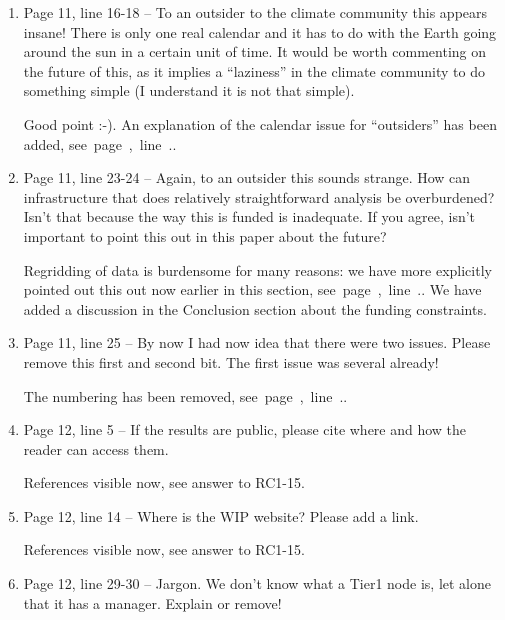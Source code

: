 \documentclass[gmd,manuscript]{copernicus}
\newcommand{\plref}[1]{\mbox{see page \pageref{p-#1}, line
    \lineref{l-#1}.}}
\newenvironment{answer}{\color{blue}}{}
\begin{document}
\begin{enumerate}[label=RC3-\arabic*,leftmargin=*]
  \begin{answer}
    References visible now, see answer to RC1-15.
  \end{answer}
\item Page 11, line 16-18 -- To an outsider to the climate community
  this appears insane! There is only one real calendar and it has to
  do with the Earth going around the sun in a certain unit of time. It
  would be worth commenting on the future of this, as it implies a
  “laziness” in the climate community to do something simple (I
  understand it is not that simple).

  \begin{answer}
    Good point :-). An explanation of the calendar issue for
    ``outsiders'' has been added, \plref{RC3-13}.
  \end{answer}
\item Page 11, line 23-24 -- Again, to an outsider this sounds strange.
  How can infrastructure that does relatively straightforward analysis
  be overburdened? Isn’t that because the way this is funded is
  inadequate. If you agree, isn’t important to point this out in this
  paper about the future?

  \begin{answer}
    Regridding of data is burdensome for many reasons: we have more
    explicitly pointed out this out now earlier in this section,
    \plref{RC3-14}. We have added a discussion in the Conclusion
    section about the funding constraints.
  \end{answer}
\item Page 11, line 25 -- By now I had now idea that there were two
  issues. Please remove this first and second bit. The first issue was
  several already!

  \begin{answer}
    The numbering has been removed, \plref{RC2-21}.
  \end{answer}
\item Page 12, line 5 -- If the results are public, please cite where
  and how the reader can access them.

  \begin{answer}
    References visible now, see answer to RC1-15.
  \end{answer}
\item Page 12, line 14 -- Where is the WIP website? Please add a link.

  \begin{answer}
    References visible now, see answer to RC1-15.
  \end{answer}
\item Page 12, line 29-30 -- Jargon. We don’t know what a Tier1 node
  is, let alone that it has a manager. Explain or remove!


\end{enumerate}
\end{document}
